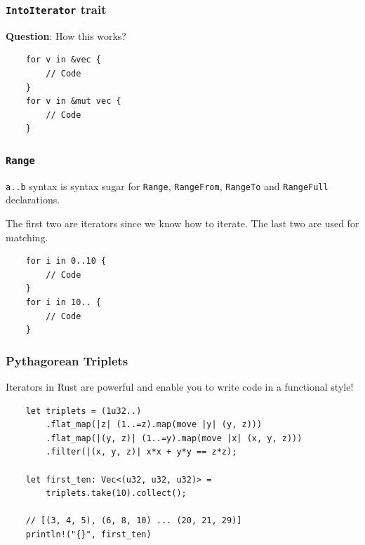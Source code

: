 \documentclass[aspectratio=1610,t]{beamer}
\begin{document}

\begin{frame}[fragile]
\frametitle{\texttt{IntoIterator} trait}
\textbf{Question}: How this works?

\begin{verbatim}
    for v in &vec {
        // Code
    }
    for v in &mut vec {
        // Code
    }
\end{verbatim}

\end{frame}


\begin{frame}[fragile]
\frametitle{\texttt{Range}}
\texttt{a..b} syntax is syntax sugar for \texttt{Range}, \texttt{RangeFrom}, \texttt{RangeTo} and \texttt{RangeFull} declarations.

The first two are iterators since we know how to iterate. The last two are used for matching.

\begin{verbatim}
    for i in 0..10 {
        // Code
    }
    for i in 10.. {
        // Code
    }
\end{verbatim}
\end{frame}


\begin{frame}[fragile]
\frametitle{Pythagorean Triplets}
Iterators in Rust are powerful and enable you to write code in a functional style!

\begin{verbatim}
    let triplets = (1u32..)
        .flat_map(|z| (1..=z).map(move |y| (y, z)))
        .flat_map(|(y, z)| (1..=y).map(move |x| (x, y, z)))
        .filter(|(x, y, z)| x*x + y*y == z*z);

    let first_ten: Vec<(u32, u32, u32)> =
        triplets.take(10).collect();

    // [(3, 4, 5), (6, 8, 10) ... (20, 21, 29)]
    println!("{}", first_ten)
\end{verbatim}
\end{frame}

\end{document}
